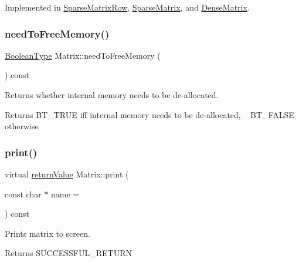 Implemented in \hyperlink{class_sparse_matrix_row_a4e79919435999fbec85be5d9f66be503}{Sparse\+Matrix\+Row}, \hyperlink{class_sparse_matrix_ae6ef806471b9e75b70277365b09346f0}{Sparse\+Matrix}, and \hyperlink{class_dense_matrix_ae627afd0fc9462e62530da8fae2f09aa}{Dense\+Matrix}.

\mbox{\label{class_matrix_a35c1d03c91df5ae7460be2383f7a2940}} 
\subsubsection{\texorpdfstring{need\+To\+Free\+Memory()}{needToFreeMemory()}}
{\footnotesize\ttfamily \hyperlink{_types_8hpp_a20f82124c82b6f5686a7fce454ef9089}{Boolean\+Type} Matrix\+::need\+To\+Free\+Memory (\begin{DoxyParamCaption}{ }\end{DoxyParamCaption}) const\hspace{0.3cm}{\ttfamily [inline]}}

Returns whether internal memory needs to be de-\/allocated. \begin{DoxyReturn}{Returns}
B\+T\+\_\+\+T\+R\+UE iff internal memory needs to be de-\/allocated, ~\newline
 B\+T\+\_\+\+F\+A\+L\+SE otherwise 
\end{DoxyReturn}
\mbox{\label{class_matrix_acc4e1dc7fa487a0c2638d88236fe35f8}} 
\subsubsection{\texorpdfstring{print()}{print()}}
{\footnotesize\ttfamily virtual \hyperlink{_message_handling_8hpp_a81d556f613bfbabd0b1f9488c0fa865e}{return\+Value} Matrix\+::print (\begin{DoxyParamCaption}\item[{const char $\ast$}]{name = {} }\end{DoxyParamCaption}) const\hspace{0.3cm}{\ttfamily [pure virtual]}}

Prints matrix to screen. \begin{DoxyReturn}{Returns}
S\+U\+C\+C\+E\+S\+S\+F\+U\+L\+\_\+\+R\+E\+T\+U\+RN 
\end{DoxyReturn}


